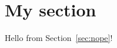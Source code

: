 \documentclass{article}
\begin{document}
\section{My section}
\label{sec:ms}
Hello from Section~\ref{sec:nope}!
\end{document}
